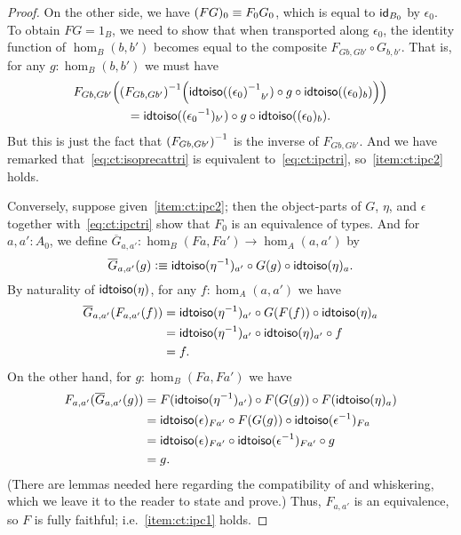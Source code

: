 \documentclass[hott-all.tex]{subfiles}
\begin{document}
\begin{proof}
  On the other side, we have $(FG)_0\jdeq F_0 G_0$, which is equal to $\idfunc[B_0]$ by $\epsilon_0$.
  To obtain $FG=1_B$, we need to show that when transported along $\epsilon_0$, the identity function of $\hom_B(b,b')$ becomes equal to the composite $F_{Gb,Gb'} \circ G_{b,b'}$.
  That is, for any $g:\hom_B(b,b')$ we must have
  \begin{multline*}
    F_{Gb,Gb'}\Big(\inv{(F_{Gb,Gb'})}\Big(\idtoiso(\opp{(\epsilon_0)}_{b'}) \circ g \circ \idtoiso((\epsilon_0)_b)\Big)\Big)\\
    = \idtoiso((\opp{\epsilon_0})_{b'}) \circ g \circ \idtoiso((\epsilon_0)_b).
  \end{multline*}
  But this is just the fact that $\inv{(F_{Gb,Gb'})}$ is the inverse of $F_{Gb,Gb'}$.
  And we have remarked that~\eqref{eq:ct:isoprecattri} is equivalent to~\eqref{eq:ct:ipctri}, so~\ref{item:ct:ipc2} holds.

  Conversely, suppose given~\ref{item:ct:ipc2}; then the object-parts of $G$, $\eta$, and $\epsilon$ together with~\eqref{eq:ct:ipctri} show that $F_0$ is an equivalence of types.
  And for $a,a':A_0$, we define $\overline{G}_{a,a'}: \hom_B(Fa,Fa') \to \hom_A(a,a')$ by
  \begin{equation}
    \overline{G}_{a,a'}(g) \defeq \idtoiso(\opp{\eta})_{a'} \circ G(g) \circ \idtoiso(\eta)_a.\fakelabel{eq:ct:gbar}
  \end{equation}
  By naturality of $\idtoiso(\eta)$, for any $f:\hom_A(a,a')$ we have
  \begin{align*}
    \overline{G}_{a,a'}(F_{a,a'}(f))
    &= \idtoiso(\opp{\eta})_{a'} \circ G(F(f)) \circ \idtoiso(\eta)_a\\
    &= \idtoiso(\opp{\eta})_{a'} \circ \idtoiso(\eta)_{a'} \circ f \\
    &= f.
  \end{align*}
  On the other hand, for $g:\hom_B(Fa,Fa')$ we have
  \begin{align*}
    F_{a,a'}(\overline{G}_{a,a'}(g))
    &= F(\idtoiso(\opp{\eta})_{a'}) \circ F(G(g)) \circ F(\idtoiso(\eta)_a)\\
    &= \idtoiso(\epsilon)_{Fa'}
    \circ F(G(g))
    \circ \idtoiso(\opp{\epsilon})_{Fa}\\
    &= \idtoiso(\epsilon)_{Fa'}
    \circ \idtoiso(\opp{\epsilon})_{Fa'}
    \circ g\\
    &= g.
  \end{align*}
  (There are lemmas needed here regarding the compatibility of \idtoiso and whiskering, which we leave it to the reader to state and prove.)
  Thus, $F_{a,a'}$ is an equivalence, so $F$ is fully faithful; i.e.~\ref{item:ct:ipc1} holds.


\end{proof}
\end{document}
